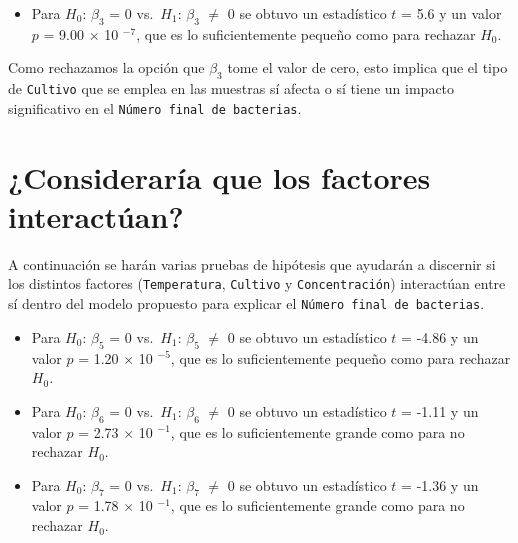 \documentclass[10pt, spanish]{article}
\providecommand{\tightlist}{%
      \setlength{\itemsep}{0pt}\setlength{\parskip}{0pt}}
\begin{document}
    \begin{itemize}
\tightlist
\item
  Para \(H_0\): \(\beta_3\) = 0 vs.~\(H_1\): \(\beta_3\) \(\neq\) 0 se
  obtuvo un estadístico \(t\) = 5.6 y un valor \(p\) = 9.00 \(\times\)
  10 \(^{-7}\), que es lo suficientemente pequeño como para rechazar \(H_0\).
\end{itemize}


    Como rechazamos la opción que \(\beta_3\) tome el valor de cero, esto
implica que el tipo de \texttt{Cultivo} que se emplea en las muestras sí afecta o
sí tiene un impacto significativo en el \texttt{Número\ final\ de\ bacterias}.

    \hypertarget{consideraruxeda-que-los-factores-interactuxfaan}{%
\section{¿Consideraría que los factores
interactúan?}\label{consideraruxeda-que-los-factores-interactuxfaan}}

    A continuación se harán varias pruebas de hipótesis que ayudarán a
discernir si los distintos factores (\texttt{Temperatura},
\texttt{Cultivo} y \texttt{Concentración}) interactúan entre sí dentro del modelo propuesto para explicar el \texttt{Número\ final\ de\ bacterias}.

    \begin{itemize}
\tightlist
\item
  Para \(H_0\): \(\beta_5\) = 0 vs.~\(H_1\): \(\beta_5\) \(\neq\) 0 se
  obtuvo un estadístico \(t\) = -4.86 y un valor \(p\) = 1.20 \(\times\)
  10 \(^{-5}\), que es lo suficientemente pequeño como para rechazar \(H_0\).
\end{itemize}


    \begin{itemize}
\tightlist
\item
  Para \(H_0\): \(\beta_6\) = 0 vs.~\(H_1\): \(\beta_6\) \(\neq\) 0 se
  obtuvo un estadístico \(t\) = -1.11 y un valor \(p\) = 2.73 \(\times\)
  10 \(^{-1}\), que es lo suficientemente grande como para no rechazar
  \(H_0\).
\end{itemize}


    \begin{itemize}
\tightlist
\item
  Para \(H_0\): \(\beta_7\) = 0 vs.~\(H_1\): \(\beta_7\) \(\neq\) 0 se
  obtuvo un estadístico \(t\) = -1.36 y un valor \(p\) = 1.78 \(\times\)
  10 \(^{-1}\), que es lo suficientemente grande como para no rechazar
  \(H_0\).
\end{itemize}
\end{document}
